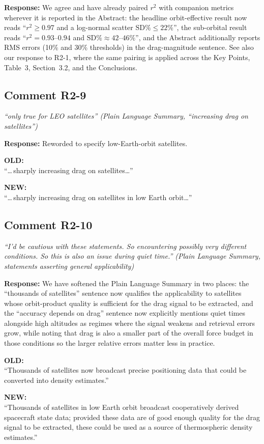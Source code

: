 \documentclass[11pt]{article}
\newcommand{\reviewercomment}[1]{%
  \medskip
  \noindent\textit{\color{reviewblue}#1}%
  \medskip
}
\newcommand{\oldtext}[1]{%
  \smallskip
  \noindent\hspace{1em}\begin{minipage}{0.92\textwidth}%
  \color{quotegray}\textbf{OLD:}\\[2pt]``#1''%
  \end{minipage}%
  \smallskip
}
\newcommand{\newtext}[1]{%
  \smallskip
  \noindent\hspace{1em}\begin{minipage}{0.92\textwidth}%
  \color{quotegreen}\textbf{NEW:}\\[2pt]``#1''%
  \end{minipage}%
  \smallskip
}
\begin{document}
\textbf{Response:}
We agree and have already paired $r^{2}$ with companion metrics
wherever it is reported in the Abstract: the headline orbit-effective
result now reads ``$r^{2} \geq 0.97$ and a log-normal scatter
$\text{SD\%} \leq 22\%$'', the sub-orbital result reads
``$r^{2} = 0.93$--$0.94$ and $\text{SD\%} \approx 42$--$46\%$'', and
the Abstract additionally reports RMS errors (10\% and 30\% thresholds)
in the drag-magnitude sentence. See also our response to R2-1, where
the same pairing is applied across the Key Points, Table~3, Section~3.2,
and the Conclusions.


\subsection{Comment R2-9}

\reviewercomment{%
``only true for LEO satellites'' (Plain Language Summary, ``increasing
drag on satellites'')}

\textbf{Response:}
Reworded to specify low-Earth-orbit satellites.

\oldtext{\dots\,sharply increasing drag on satellites\dots}

\newtext{\dots\,sharply increasing drag on satellites in low Earth orbit\dots}


\subsection{Comment R2-10}

\reviewercomment{%
``I'd be cautious with these statements. So encountering possibly very
different conditions. So this is also an issue during quiet time.''
(Plain Language Summary, statements asserting general applicability)}

\textbf{Response:}
We have softened the Plain Language Summary in two places: the
``thousands of satellites'' sentence now qualifies the applicability to
satellites whose orbit-product quality is sufficient for the drag
signal to be extracted, and the ``accuracy depends on drag'' sentence
now explicitly mentions quiet times alongside high altitudes as
regimes where the signal weakens and retrieval errors grow, while
noting that drag is also a smaller part of the overall force budget
in those conditions so the larger relative errors matter less in
practice.

\oldtext{Thousands of satellites now broadcast precise positioning data that could be converted into density estimates.}

\newtext{Thousands of satellites in low Earth orbit broadcast cooperatively derived spacecraft state data; provided these data are of good enough quality for the drag signal to be extracted, these could be used as a source of thermospheric density estimates.}
\end{document}
